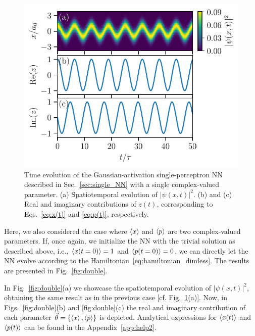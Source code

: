 \documentclass[aps,pre,superscriptaddress,amsmath,amssymb,amsfonts,twocolumn,showpacs,notitlepage]{revtex4-1}
\begin{document}
	\begin{figure} 
		\centering
		\includegraphics[width=\columnwidth]{single.pdf}
		\caption{
			Time evolution of the Gaussian-activation single-perceptron NN described in Sec.~\ref{sec:single_NN} with a single complex-valued parameter.
			(a) Spatiotemporal evolution of $|\psi(x,t)|^2$.
			(b) and (c) Real and imaginary contributions of $z(t)$, corresponding to Eqs.~\eqref{eq:x(t)} and \eqref{eq:p(t)}, respectively.
			}
		\label{fig:single}
	\end{figure}	
	
	Here, we also considered the case where $\ev{x}$ and $\ev{p}$ are two complex-valued parameters.
	If, once again, we initialize the NN with the trivial solution as described above, i.e., $\ev{x(t=0)}=1$ and $\ev{p(t=0)}=0$, we can directly let the NN evolve according to the Hamiltonian~\eqref{eq:hamiltonian_dimless}.
	The results are presented in Fig.~\ref{fig:double}.
	
	In Fig.~\ref{fig:double}(a) we showcase the spatiotemporal evolution of $| \psi(x,t)|^2$, obtaining the same result as in the previous case [cf. Fig.~\ref{fig:single}(a)].
	Now, in Figs.~\ref{fig:double}(b) and \ref{fig:double}(c) the real and imaginary contribution of each parameter $\vec{\theta}=\qty{\ev{x}, \ev{p}}$ is depicted.
	Analytical expressions for $\ev{x(t)}$ and $\ev{p(t)}$ can be found in the Appendix~\ref{app:help2}.
	
\end{document}

